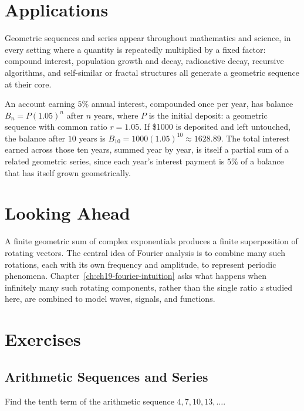 \section{Applications}

Geometric sequences and series appear throughout mathematics and
science, in every setting where a quantity is repeatedly multiplied by a
fixed factor: compound interest, population growth and decay,
radioactive decay, recursive algorithms, and self-similar or fractal
structures all generate a geometric sequence at their core.

\begin{example}
An account earning $5\%$ annual interest, compounded once per year, has
balance $B_n = P(1.05)^n$ after $n$ years, where $P$ is the initial
deposit: a geometric sequence with common ratio $r = 1.05$. If \$1000 is
deposited and left untouched, the balance after $10$ years is $B_{10} =
1000(1.05)^{10} \approx 1628.89$. The total interest earned across those
ten years, summed year by year, is itself a partial sum of a related
geometric series, since each year's interest payment is $5\%$ of a
balance that has itself grown geometrically.
\end{example}

\section{Looking Ahead}

A finite geometric sum of complex exponentials produces a finite
superposition of rotating vectors. The central idea of Fourier analysis
is to combine many such rotations, each with its own frequency and
amplitude, to represent periodic phenomena.
Chapter~\ref{ch:ch19-fourier-intuition} asks what happens when
infinitely many such rotating components, rather than the single ratio
$z$ studied here, are combined to model waves, signals, and functions.

\section{Exercises}

\subsection*{Arithmetic Sequences and Series}
\begin{exercise}
Find the tenth term of the arithmetic sequence $4, 7, 10, 13, \dots$.
\end{exercise}


